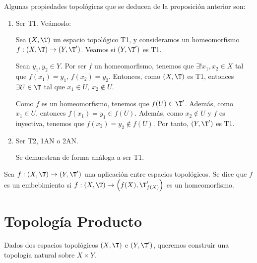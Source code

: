 \begin{ejemplo}
    Algunas propiedades topológicas que se deducen de la proposición anterior son:
    \begin{enumerate}
        \item Ser T1. Veámoslo:

        Sea $(X,\T)$ un espacio topológico T1, y consideramos un homeomorfismo $f:(X,\T)\to (Y,\T')$. Veamos si $(Y,\T')$ es T1.

        Sean $y_1,y_2\in Y$. Por ser $f$ un homeomorfismo, tenemos que $\exists! x_1,x_2\in X$ tal que $f(x_1)=y_1$, $f(x_2)=y_2$. Entonces, como $(X,\T)$ es T1, entonces $\exists U\in \T$ tal que $x_1\in U,~x_2\notin U$.

        Como $f$ es un homeomorfismo, tenemos que $f(U)\in \T'$. Además, como $x_1\in U$, entonces $f(x_1)=y_1\in f(U)$. Además, como $x_2\notin U$ y $f$ es inyectiva, tenemos que $f(x_2)=y_2\notin f(U)$. Por tanto, $(Y,\T')$ es T1.

        \item Ser T2, 1AN o 2AN.

        Se demuestran de forma análoga a ser T1.
    \end{enumerate}
\end{ejemplo}

\begin{definicion}[Embebimiento]
    Sea $f:(X,\T)\to (Y,\T')$ una aplicación entre espacios topológicos. Se dice que $f$ es un embebimiento si $f:(X,\T)\to \left(f(X),\T'_{f(X)}\right)$ es un homeomorfismo.
\end{definicion}




\section{Topología Producto}\label{sec:TopProducto}
Dados dos espacios topológicos $(X,\T)$ e $(Y,\T')$, queremos construir una topología natural sobre $X\times Y$.


